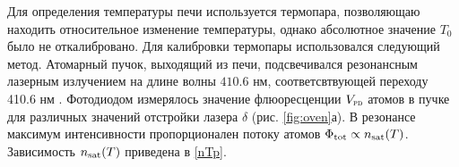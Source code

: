 
\startp
{}
Для определения температуры печи используется термопара, позволяющаю находить относительное изменение температуры, однако абсолютное значение $T_0$ было не откалибровано. Для калибровки термопары использовался следующий метод. Атомарный пучок, выходящий из печи, подсвечивался резонансным лазерным излучением на длине волны $410.6$ нм, соответсвтвующей переходу 410.6 нм \cite{vlad}. Фотодиодом измерялось значение флюоресценции  $\subt{V}{PD}$ атомов в пучке для различных значений отстройки лазера $\delta$ (рис. \ref{fig:oven}а). В резонансе максимум интенсивности пропорционален потоку атомов $\Phi_{\textnormal{tot}}  \propto n_{\textnormal{sat}}(T) $. Зависимость  $n_{\textnormal{sat}}(T)$ приведена в \eqref{nTp}.



